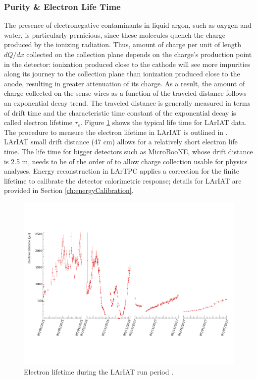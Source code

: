 \subsubsection{Purity \& Electron Life Time }
The presence of electronegative contaminants in liquid argon, such as oxygen and water, is particularly
pernicious, since these molecules quench the charge produced by the ionizing radiation.  Thus, amount of charge per unit of length $dQ/dx$ collected on the collection plane depends on the charge's production point in the detector: ionization produced  close to the cathode will see more impurities along its journey to the collection plane than ionization produced close to the anode, resulting in greater attenuation of its charge. As a result,  the amount of charge collected on the sense wires as a function of the traveled distance follows an exponential decay trend. The traveled distance is generally measured in terms of drift time and the  characteristic time constant of the exponential decay is called electron lifetime $\tau_e$. Figure \ref{fig:Elifetime} shows the typical life time for LArIAT data. The procedure to measure the electron lifetime in LArIAT is outlined in \cite{LArIATLifeTime}. LArIAT small drift distance (47 cm) allows for a relatively short electron life time. The life time for bigger detectors such as MicroBooNE, whose drift distance is 2.5 m, needs to be of the order of  to allow charge collection usable for physics analyses. Energy reconstruction in LArTPC applies a correction for the finite lifetime to calibrate the detector calorimetric response; details for LArIAT are provided in Section \ref{ch:energyCalibration}.

\begin{figure}[hbpt]
\centering
\includegraphics[width=\textwidth]{Chapter-2/Images/ELifetime.png}
\caption{Electron lifetime during the LArIAT run period \cite{detectorPaper}.}
\label{fig:Elifetime}
\end{figure}


